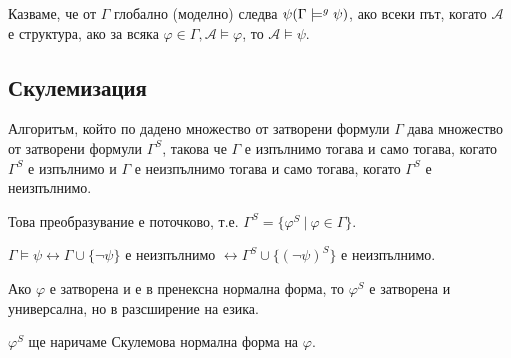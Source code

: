 \documentclass{article}
\begin{document}
\begin{mydef}
Казваме, че от $\Gamma$ глобално (моделно) следва $\psi \\ (\Gamma \models^g \psi)$, ако всеки път, когато $\mathcal{A}$ е структура, ако за всяка $\varphi \in \Gamma, \mathcal{A} \models \varphi$, то $\mathcal{A} \models \psi$.
\end{mydef}

\subsection*{Скулемизация}

\begin{mydef}[Скулемизация]
Алгоритъм, който по дадено множество от затворени формули $\Gamma$ дава множество от затворени формули $\Gamma^S$, такова че $\Gamma$ е изпълнимо тогава и само тогава, когато $\Gamma^S$ е изпълнимо и $\Gamma$ е неизпълнимо тогава и само тогава, когато $\Gamma^S$ е неизпълнимо.

Това преобразувание е поточково, т.е. $\Gamma^S = \{\varphi^S\ |\ \varphi \in \Gamma\}$.

$\Gamma \models \psi \longleftrightarrow \Gamma \cup \{\neg\psi\}$ е неизпълнимо $\longleftrightarrow \Gamma^S\cup\{(\neg\psi)^S\}$ е неизпълнимо.
\end{mydef}

\begin{mydef}
Ако $\varphi$ е затворена и е в пренексна нормална форма, то $\varphi^S$ е затворена и универсална, но в разсширение на езика.

$\varphi^S$ ще наричаме Скулемова нормална форма на $\varphi$.
\end{mydef}
\end{document}

